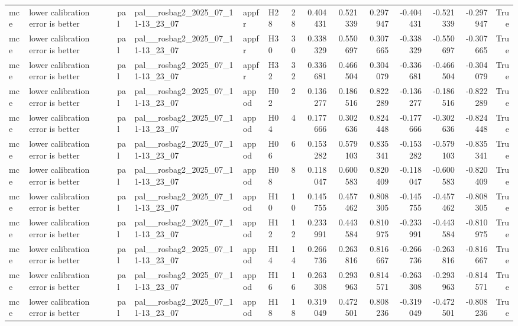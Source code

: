 \begin{longtable}{llllllrrrrrrrr}
mce & lower calibration error is better & pal & pal\_\_rosbag2\_2025\_07\_11-13\_23\_07 & appfr & H28 & 28 & 0.404431 & 0.521339 & 0.297947 & -0.404431 & -0.521339 & -0.297947 & True \\
mce & lower calibration error is better & pal & pal\_\_rosbag2\_2025\_07\_11-13\_23\_07 & appfr & H30 & 30 & 0.338329 & 0.550697 & 0.307665 & -0.338329 & -0.550697 & -0.307665 & True \\
mce & lower calibration error is better & pal & pal\_\_rosbag2\_2025\_07\_11-13\_23\_07 & appfr & H32 & 32 & 0.336681 & 0.466504 & 0.304079 & -0.336681 & -0.466504 & -0.304079 & True \\
mce & lower calibration error is better & pal & pal\_\_rosbag2\_2025\_07\_11-13\_23\_07 & appod & H02 & 2 & 0.136277 & 0.186516 & 0.822289 & -0.136277 & -0.186516 & -0.822289 & True \\
mce & lower calibration error is better & pal & pal\_\_rosbag2\_2025\_07\_11-13\_23\_07 & appod & H04 & 4 & 0.177666 & 0.302636 & 0.824448 & -0.177666 & -0.302636 & -0.824448 & True \\
mce & lower calibration error is better & pal & pal\_\_rosbag2\_2025\_07\_11-13\_23\_07 & appod & H06 & 6 & 0.153282 & 0.579103 & 0.835341 & -0.153282 & -0.579103 & -0.835341 & True \\
mce & lower calibration error is better & pal & pal\_\_rosbag2\_2025\_07\_11-13\_23\_07 & appod & H08 & 8 & 0.118047 & 0.600583 & 0.820409 & -0.118047 & -0.600583 & -0.820409 & True \\
mce & lower calibration error is better & pal & pal\_\_rosbag2\_2025\_07\_11-13\_23\_07 & appod & H10 & 10 & 0.145755 & 0.457462 & 0.808305 & -0.145755 & -0.457462 & -0.808305 & True \\
mce & lower calibration error is better & pal & pal\_\_rosbag2\_2025\_07\_11-13\_23\_07 & appod & H12 & 12 & 0.233991 & 0.443584 & 0.810975 & -0.233991 & -0.443584 & -0.810975 & True \\
mce & lower calibration error is better & pal & pal\_\_rosbag2\_2025\_07\_11-13\_23\_07 & appod & H14 & 14 & 0.266736 & 0.263816 & 0.816667 & -0.266736 & -0.263816 & -0.816667 & True \\
mce & lower calibration error is better & pal & pal\_\_rosbag2\_2025\_07\_11-13\_23\_07 & appod & H16 & 16 & 0.263308 & 0.293963 & 0.814571 & -0.263308 & -0.293963 & -0.814571 & True \\
mce & lower calibration error is better & pal & pal\_\_rosbag2\_2025\_07\_11-13\_23\_07 & appod & H18 & 18 & 0.319049 & 0.472501 & 0.808236 & -0.319049 & -0.472501 & -0.808236 & True \\

\end{longtable}

